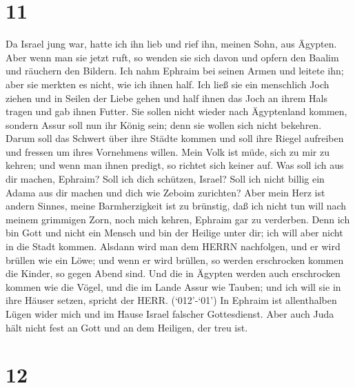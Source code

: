 \hypertarget{section-10}{%
\section{11}\label{section-10}}

 Da Israel jung war, hatte ich ihn lieb und rief ihn, meinen
Sohn, aus Ägypten.  Aber wenn man sie jetzt ruft, so wenden
sie sich davon und opfern den Baalim und räuchern den Bildern.
 Ich nahm Ephraim bei seinen Armen und leitete ihn; aber sie
merkten es nicht, wie ich ihnen half.  Ich ließ sie ein
menschlich Joch ziehen und in Seilen der Liebe gehen und half ihnen das
Joch an ihrem Hals tragen und gab ihnen Futter.  Sie sollen
nicht wieder nach Ägyptenland kommen, sondern Assur soll nun ihr König
sein; denn sie wollen sich nicht bekehren.  Darum soll das
Schwert über ihre Städte kommen und soll ihre Riegel aufreiben und
fressen um ihres Vornehmens willen.  Mein Volk ist müde,
sich zu mir zu kehren; und wenn man ihnen predigt, so richtet sich
keiner auf.  Was soll ich aus dir machen, Ephraim? Soll ich
dich schützen, Israel? Soll ich nicht billig ein Adama aus dir machen
und dich wie Zeboim zurichten? Aber mein Herz ist andern Sinnes, meine
Barmherzigkeit ist zu brünstig,  daß ich nicht tun will nach
meinem grimmigen Zorn, noch mich kehren, Ephraim gar zu verderben. Denn
ich bin Gott und nicht ein Mensch und bin der Heilige unter dir; ich
will aber nicht in die Stadt kommen.  Alsdann wird man dem
HERRN nachfolgen, und er wird brüllen wie ein Löwe; und wenn er wird
brüllen, so werden erschrocken kommen die Kinder, so gegen Abend sind.
 Und die in Ägypten werden auch erschrocken kommen wie die
Vögel, und die im Lande Assur wie Tauben; und ich will sie in ihre
Häuser setzen, spricht der HERR.  (`012'-`01') In Ephraim
ist allenthalben Lügen wider mich und im Hause Israel falscher
Gottesdienst. Aber auch Juda hält nicht fest an Gott und an dem
Heiligen, der treu ist.

\hypertarget{section-11}{%
\section{12}\label{section-11}}

